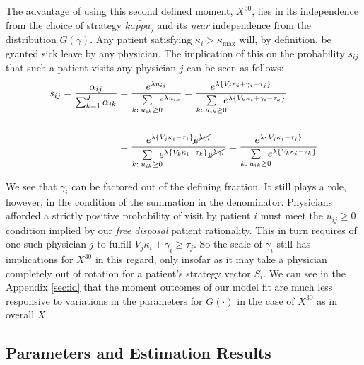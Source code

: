 \documentclass[../main.tex]{subfiles}
\begin{document}
The advantage of using this second defined moment, $X^{30}$, lies in its independence from the choice of strategy $\bar{kappa_j}$ and its \textit{near} independence from the distribution $G(\gamma)$. Any patient satisfying $\kappa_i > \bar{\kappa}_{\max}$ will, by definition, be granted sick leave by any physician. The implication of this on the probability $s_{ij}$ that such a patient visits any physician $j$ can be seen as follows:
\begin{align*}
    s_{ij} = \frac{\alpha_{ij}}{\sum_{k = 1}^{J} \alpha_{ik}} & =
    \frac{e^{\lambda u_{ij}}}{\sum\limits_{k : \; u_{ik} \geq 0} \hspace{-0.5em} e^{\lambda u_{ik}}} 
    =
    \frac{e^{\lambda \{V_j \kappa_i + \gamma_i - \tau_j \}}}{\sum\limits_{k : \; u_{ik} \geq 0} \hspace{-0.5em} e^{\lambda \{V_k \kappa_i + \gamma_i - \tau_k \}}} \\
    \\ 
   & = \frac{e^{\lambda \{V_j \kappa_i - \tau_j \}} \cancel{e^{\lambda \gamma_i}}}{\sum\limits_{k : \; u_{ik} \geq 0} \hspace{-0.5em} e^{\lambda \{V_k \kappa_i  - \tau_k \}} \cancel{e^{\lambda\gamma_i}}} =
    \frac{e^{\lambda \{V_j \kappa_i - \tau_j \}}}{\sum\limits_{k : \; u_{ik} \geq 0} \hspace{-0.5em} e^{\lambda \{V_k \kappa_i - \tau_k \}}}
\end{align*}

We see that $\gamma_i$ can be factored out of the defining fraction. It still plays a role, however, in the condition of the summation in the denominator. Physicians afforded a strictly positive probability of visit by patient $i$ must meet the $u_{ij} \geq 0$ condition implied by our \textit{free disposal} patient rationality. This in turn requires of one such physician $j$ to fulfill $V_j \kappa_i + \gamma_i \geq \tau_j$. So the scale of $\gamma_i$ still has implications for $X^{30}$ in this regard, only insofar as it may take a physician completely out of rotation for a patient's strategy vector $S_i$. We can see in the Appendix \ref{sec:id} that the moment outcomes of our model fit are much less responsive to variations in the parameters for $G(\cdot)$ in the case of $X^{30}$ as in overall $X$.


\subsection{Parameters and Estimation Results}
\end{document}
